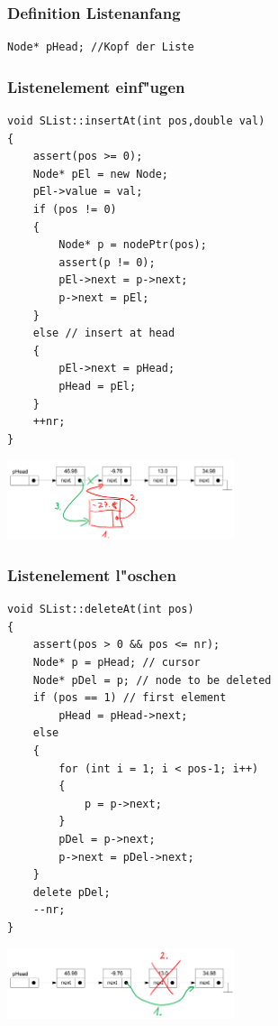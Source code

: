\subsubsection{Definition Listenanfang}
\begin{lstlisting}[style=C]
Node* pHead; //Kopf der Liste
\end{lstlisting}

\subsubsection{Listenelement einf"ugen}
\begin{lstlisting}[style=C]
void SList::insertAt(int pos,double val)
{
	assert(pos >= 0);
	Node* pEl = new Node;
	pEl->value = val;
	if (pos != 0)
	{
		Node* p = nodePtr(pos);
		assert(p != 0);
		pEl->next = p->next;
		p->next = pEl;
	}
	else // insert at head
	{
		pEl->next = pHead;
		pHead = pEl;
	}
	++nr;
}
\end{lstlisting}
\begin{flushleft}
{\includegraphics[width=0.5\textwidth]{images/Listen/SLL_Insert.png}}
\label{Fig: Element bei SLL einf"ugen}
\end{flushleft}

\subsubsection{Listenelement l"oschen}
\begin{lstlisting}[style=C]
void SList::deleteAt(int pos)
{
	assert(pos > 0 && pos <= nr);
	Node* p = pHead; // cursor
	Node* pDel = p; // node to be deleted
	if (pos == 1) // first element
		pHead = pHead->next;
	else
	{
		for (int i = 1; i < pos-1; i++)
		{
			p = p->next;
		}
		pDel = p->next;
		p->next = pDel->next;
	}
	delete pDel;
	--nr;
}
\end{lstlisting}
\begin{flushleft}
{\includegraphics[width=0.5\textwidth]{images/Listen/SLL_Delete.png}}
\label{Fig: Element bei SLL l"oschen}
\end{flushleft}

